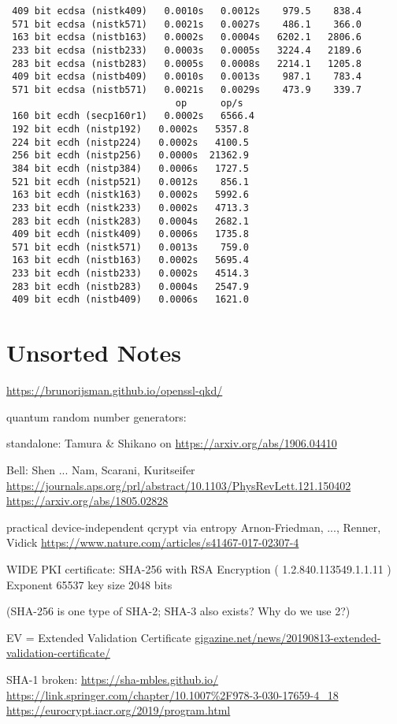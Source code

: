 \documentclass[%
 aip,
 jmp,%
 amsmath,amssymb,
 reprint,%
]{revtex4-1}
\begin{document}
\begin{verbatim}
 409 bit ecdsa (nistk409)   0.0010s   0.0012s    979.5    838.4
 571 bit ecdsa (nistk571)   0.0021s   0.0027s    486.1    366.0
 163 bit ecdsa (nistb163)   0.0002s   0.0004s   6202.1   2806.6
 233 bit ecdsa (nistb233)   0.0003s   0.0005s   3224.4   2189.6
 283 bit ecdsa (nistb283)   0.0005s   0.0008s   2214.1   1205.8
 409 bit ecdsa (nistb409)   0.0010s   0.0013s    987.1    783.4
 571 bit ecdsa (nistb571)   0.0021s   0.0029s    473.9    339.7
                              op      op/s
 160 bit ecdh (secp160r1)   0.0002s   6566.4
 192 bit ecdh (nistp192)   0.0002s   5357.8
 224 bit ecdh (nistp224)   0.0002s   4100.5
 256 bit ecdh (nistp256)   0.0000s  21362.9
 384 bit ecdh (nistp384)   0.0006s   1727.5
 521 bit ecdh (nistp521)   0.0012s    856.1
 163 bit ecdh (nistk163)   0.0002s   5992.6
 233 bit ecdh (nistk233)   0.0002s   4713.3
 283 bit ecdh (nistk283)   0.0004s   2682.1
 409 bit ecdh (nistk409)   0.0006s   1735.8
 571 bit ecdh (nistk571)   0.0013s    759.0
 163 bit ecdh (nistb163)   0.0002s   5695.4
 233 bit ecdh (nistb233)   0.0002s   4514.3
 283 bit ecdh (nistb283)   0.0004s   2547.9
 409 bit ecdh (nistb409)   0.0006s   1621.0
\end{verbatim}

\section{Unsorted Notes}

\url{https://brunorijsman.github.io/openssl-qkd/}

quantum random number generators:

standalone: Tamura \& Shikano on 
\url{https://arxiv.org/abs/1906.04410}

Bell:
Shen ... Nam, Scarani, Kuritseifer
\url{https://journals.aps.org/prl/abstract/10.1103/PhysRevLett.121.150402}
\url{https://arxiv.org/abs/1805.02828}

practical device-independent qcrypt via entropy
Arnon-Friedman, ..., Renner, Vidick
\url{https://www.nature.com/articles/s41467-017-02307-4}

WIDE PKI certificate:
SHA-256 with RSA Encryption ( 1.2.840.113549.1.1.11 )
Exponent 65537
key size 2048 bits

(SHA-256 is one type of SHA-2; SHA-3 also exists? Why do we use 2?)

EV = Extended Validation Certificate
\url{gigazine.net/news/20190813-extended-validation-certificate/}

SHA-1 broken:
\url{https://sha-mbles.github.io/}
\url{https://link.springer.com/chapter/10.1007%2F978-3-030-17659-4_18}
\url{https://eurocrypt.iacr.org/2019/program.html}
\end{document}
